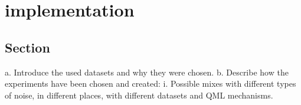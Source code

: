 \chapter{implementation}\label{chapter:implementation}

\section{Section}
a.	Introduce the used datasets and why they were chosen.
b.	Describe how the experiments have been chosen and created:
    i.	Possible mixes with different types of noise, in different places, with different datasets and QML mechanisms.
